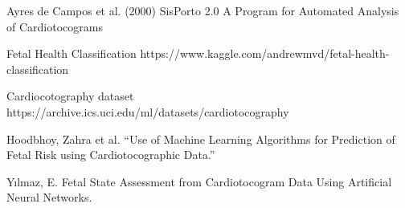 \documentclass[a4paper,12pt]{article}
\begin{document}
\newpage
\begin{thebibliography}{9}
Ayres de Campos et al. (2000) SisPorto 2.0 A Program for Automated Analysis of Cardiotocograms

Fetal Health Classification https://www.kaggle.com/andrewmvd/fetal-health-classification

Cardiocotography dataset https://archive.ics.uci.edu/ml/datasets/cardiotocography

Hoodbhoy, Zahra et al. “Use of Machine Learning Algorithms for Prediction of Fetal Risk using Cardiotocographic Data.”

Yılmaz, E. Fetal State Assessment from Cardiotocogram Data Using Artificial Neural Networks.

\end{thebibliography}
\end{document}
